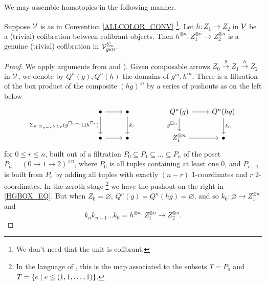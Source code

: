 \documentclass[a4paper,10pt
,draft
]{article}%
\renewcommand{\1}{\eta}%
\begin{document}


We may assemble homotopies in the following manner.

\begin{lemma}
      Suppose $\mathcal V$ is as in Convention \ref{ALLCOLOR_CONV} \footnote{
        We don't need that the unit is cofibrant.}.
      Let $h: Z_1 \to Z_2$ in $\mathcal V$ be a (trivial) cofibration between cofibrant objects.
      Then $h^{\otimes n}: Z_1^{\otimes n} \to Z_2^{\otimes n}$ is a genuine (trivial) cofibration in $\mathcal V^{\Sigma_n}_{gen}$.
\end{lemma}
\begin{proof}
      We apply arguments from \cite[Prop. 6.24]{BP_geo} and \cite[Lemma 4.8]{Pe16}).
      Given composable arrows $Z_0 \xrightarrow{g} Z_1 \xrightarrow{h} Z_2$ in $\mathcal V$,
      we denote by $Q^n(g), Q^n(h)$ the domains of $g^{\square n}, h^{\square n}$.
      There is a filtration of the box product of the composite $(hg)^{\square n}$ by a series of pushouts as on the left below
      \begin{equation}
            \label{HGBOX_EQ}
            \begin{tikzcd}
                  \bullet \arrow[d, "\Sigma_n \cdot_{\Sigma_{n-r} \times \Sigma_r} (g^{\square n-r} \square h^{\square r})"'] \arrow[r]
                  &
                  \bullet \arrow[d, "k_r"]
                  & &%
                  Q^n(g) \arrow[r] \arrow[d, "g^{\square n}"']
                  &
                  Q^n(hg) \arrow[d, "k_0"]
                  \\
                  \bullet \arrow[r]
                  &
                  \bullet
                  & &%
                  Z_1^{\otimes n} \arrow[r]
                  &
                  \bullet
            \end{tikzcd}
      \end{equation}
      for $0 \leq r \leq n$,
      built out of a filtration $P_0 \subseteq P_1 \subseteq \dots \subseteq P_n$ of the poset $P_n = (0 \to 1 \to 2)^{\times n}$,
      where $P_0$ is all tuples containing at least one 0, and
      $P_{r+1}$ is built from $P_r$ by adding all tuples with exactly $(n-r)$ 1-coordinates and $r$ 2-coordinates.
      In the zeroth stage \footnote{
        In the language of \cite[Lemma 4.8]{Pe16}, this is the map associated to the subsets
        $T = P_0$ and $\bar T = \left\{ e \;|\; e \leq (1,1,\dots,1)\right\}$.}
      we have the pushout on the right in \eqref{HGBOX_EQ}.
      But when $Z_0 = \varnothing$, $Q^n(g) = Q^n(hg) = \varnothing$, and so
      $k_0: \varnothing \to Z_1^{\otimes n}$ and
      \[
            k_n k_{n-1} \dots k_0 = h^{\otimes n}: Z_1^{\otimes n} \to Z_2^{\otimes n}.
      \]


\end{proof}
\end{document}
